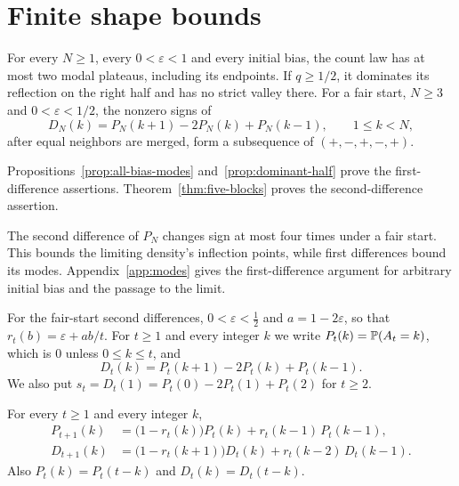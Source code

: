 \section{Finite shape bounds}\label{sec:convex}

\begin{theorem}\label{thm:shape-engine}
For every $N\ge1$, every $0<\varepsilon<1$ and every initial bias,
the count law has at most two modal plateaus, including its endpoints.
If $q\ge1/2$, it dominates its reflection on the right half and has
no strict valley there. For a fair start, $N\ge3$ and
$0<\varepsilon<1/2$, the nonzero signs of
\[
 D_N(k)=P_N(k+1)-2P_N(k)+P_N(k-1),\qquad 1\le k<N,
\]
after equal neighbors are merged, form a subsequence of $(+,-,+,-,+)$.
\end{theorem}

Propositions~\ref{prop:all-bias-modes} and~\ref{prop:dominant-half}
prove the first-difference assertions. Theorem~\ref{thm:five-blocks}
proves the second-difference assertion.

The second difference of $P_N$ changes sign at most four times
under a fair start. This bounds the limiting density's inflection
points, while first differences bound its modes.
Appendix~\ref{app:modes} gives the first-difference argument for
arbitrary initial bias and the passage to the limit.

For the fair-start second differences, $0<\varepsilon<\frac12$ and $a=1-2\varepsilon$, so
that $r_t(b)=\varepsilon+ab/t$. For $t\ge1$ and every integer $k$ we write
$P_t(k)=\mathbb{P}(A_t=k)$, which is $0$ unless $0\le k\le t$, and
\[
 D_t(k)=P_t(k+1)-2P_t(k)+P_t(k-1).
\]
We also put $s_t=D_t(1)=P_t(0)-2P_t(1)+P_t(2)$ for $t\ge2$.

\begin{lemma}\label{lem:D-rec}
For every $t\ge1$ and every integer $k$,
\begin{align}
 P_{t+1}(k)&=\bigl(1-r_t(k)\bigr)P_t(k)+r_t(k-1)\,P_t(k-1),\label{eq:P-rec}\\
 D_{t+1}(k)&=\bigl(1-r_t(k+1)\bigr)D_t(k)+r_t(k-2)\,D_t(k-1).\label{eq:D-rec}
\end{align}
Also $P_t(k)=P_t(t-k)$ and $D_t(k)=D_t(t-k)$.
\end{lemma}

